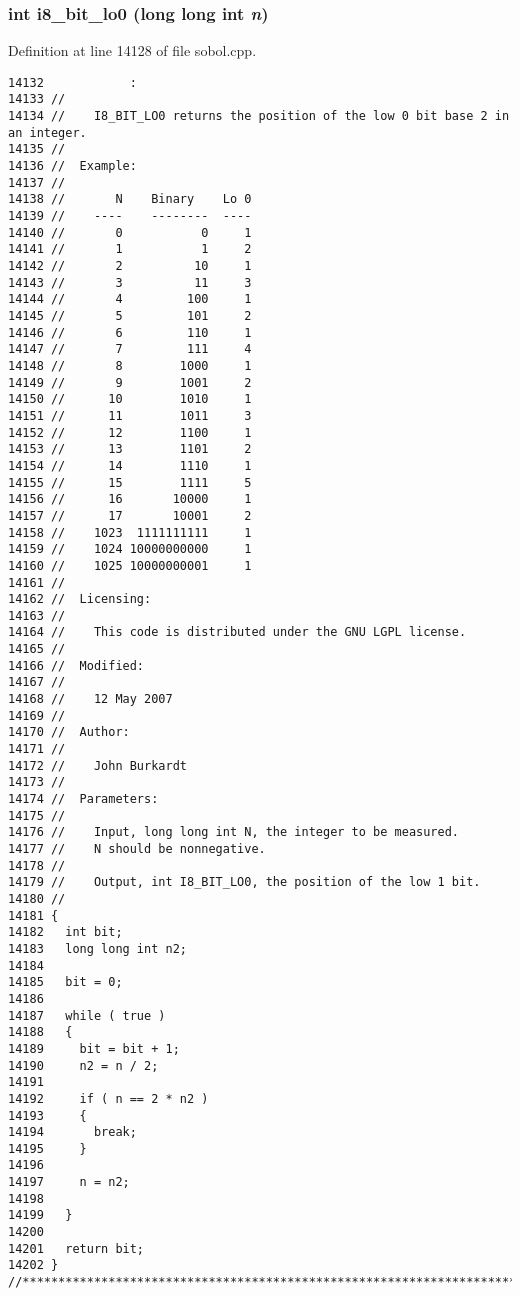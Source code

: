 \subsubsection{\setlength{\rightskip}{0pt plus 5cm}int i8\_\-bit\_\-lo0 (long long int {\em n})}\label{test_2sobol_8H_6f15ee288a7be154bf55768d59ac8124}




Definition at line 14128 of file sobol.cpp.

\begin{Code}\begin{verbatim}14132            :
14133 //
14134 //    I8_BIT_LO0 returns the position of the low 0 bit base 2 in an integer.
14135 //
14136 //  Example:
14137 //
14138 //       N    Binary    Lo 0
14139 //    ----    --------  ----
14140 //       0           0     1
14141 //       1           1     2
14142 //       2          10     1
14143 //       3          11     3 
14144 //       4         100     1
14145 //       5         101     2
14146 //       6         110     1
14147 //       7         111     4
14148 //       8        1000     1
14149 //       9        1001     2
14150 //      10        1010     1
14151 //      11        1011     3
14152 //      12        1100     1
14153 //      13        1101     2
14154 //      14        1110     1
14155 //      15        1111     5
14156 //      16       10000     1
14157 //      17       10001     2
14158 //    1023  1111111111     1
14159 //    1024 10000000000     1
14160 //    1025 10000000001     1
14161 //
14162 //  Licensing:
14163 //
14164 //    This code is distributed under the GNU LGPL license. 
14165 //
14166 //  Modified:
14167 //
14168 //    12 May 2007
14169 //
14170 //  Author:
14171 //
14172 //    John Burkardt
14173 //
14174 //  Parameters:
14175 //
14176 //    Input, long long int N, the integer to be measured.
14177 //    N should be nonnegative.
14178 //
14179 //    Output, int I8_BIT_LO0, the position of the low 1 bit.
14180 //
14181 {
14182   int bit;
14183   long long int n2;
14184 
14185   bit = 0;
14186 
14187   while ( true )
14188   {
14189     bit = bit + 1;
14190     n2 = n / 2;
14191 
14192     if ( n == 2 * n2 )
14193     {
14194       break;
14195     }
14196 
14197     n = n2;
14198 
14199   }
14200 
14201   return bit;
14202 }
//****************************************************************************80
\end{verbatim}
\end{Code}


